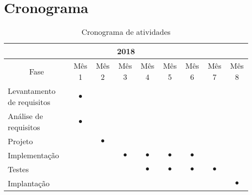 \section{Cronograma}

\begin{table}[!htb]
	 \caption{Cronograma de atividades}
	 \label{tab:cronograma}
	 \begin{center}
		  \begin{tabular}{l||c|c|c|c|c|c|c|c}
			    \hline
			    \multicolumn{9}{c}{2018} \\ \hline \hline
			    \multicolumn{1}{c||}{Fase} & M\^es 1     & M\^es 2     & M\^es 3     & M\^es 4   & M\^es 5 & M\^es 6 & M\^es 7 & M\^es 8\\ \hline
			    Levantamento de requisitos    & $\bullet$ &           &          &         &  &  &  & \\
			    An\'alise de requisitos    & $\bullet$          &  & &         &  &  &  &\\
			    Projeto   &           &  $\bullet$         & & &  &  &  &\\
			    Implementa\c{c}\~ao    &           &          &   $\bullet$       &  $\bullet$        &  $\bullet$  & $\bullet$ &  &\\
			    Testes    &           &           & &$\bullet$ & $\bullet$ & $\bullet$ &$\bullet$  &\\
			    Implanta\c{c}\~ao    &           &           & & &  &  &  &$\bullet$\\
			    \hline
			  \end{tabular}
		 \vspace{8pt} %
		 \end{center}
\end{table}